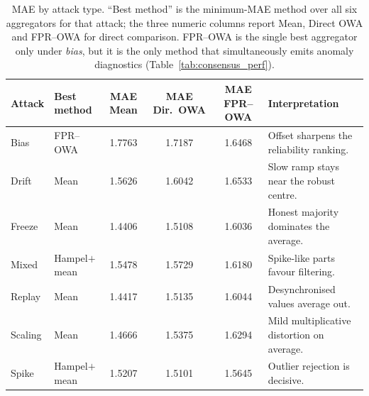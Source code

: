 \begin{table}[!tbp]
\centering
\caption{MAE by attack type. ``Best method'' is the minimum-MAE method over all six aggregators for that attack; the three numeric columns report Mean, Direct OWA and FPR--OWA for direct comparison. FPR--OWA is the single best aggregator only under \emph{bias}, but it is the only method that simultaneously emits anomaly diagnostics (Table~\ref{tab:consensus_perf}).}
\label{tab:per_attack}
\footnotesize
\begin{tabular}{llccc>{\raggedright\arraybackslash}p{}}
\toprule
\textbf{Attack} & \textbf{Best method} & \textbf{MAE Mean} & \textbf{MAE Dir.\ OWA} & \textbf{MAE FPR--OWA} & \textbf{Interpretation} \\
\midrule
Bias & FPR--OWA & 1.7763 & 1.7187 & 1.6468 & Offset sharpens the reliability ranking. \\
Drift & Mean & 1.5626 & 1.6042 & 1.6533 & Slow ramp stays near the robust centre. \\
Freeze & Mean & 1.4406 & 1.5108 & 1.6036 & Honest majority dominates the average. \\
Mixed & Hampel$+$mean & 1.5478 & 1.5729 & 1.6180 & Spike-like parts favour filtering. \\
Replay & Mean & 1.4417 & 1.5135 & 1.6044 & Desynchronised values average out. \\
Scaling & Mean & 1.4666 & 1.5375 & 1.6294 & Mild multiplicative distortion on average. \\
Spike & Hampel$+$mean & 1.5207 & 1.5101 & 1.5645 & Outlier rejection is decisive. \\
\bottomrule
\end{tabular}
\end{table}